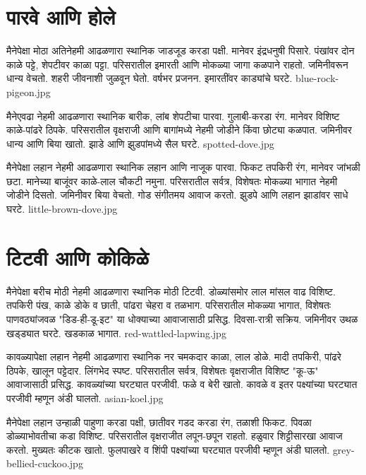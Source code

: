 \documentclass[aspectratio=169]{beamer}
\begin{document}
\section{पारवे आणि होले}
{मैनेपेक्षा मोठा}
{अतिनेहमी आढळणारा स्थानिक}
{जाडजूड करडा पक्षी. मानेवर इंद्रधनुषी पिसारे. पंखांवर दोन काळे पट्टे, शेपटीवर काळा पट्टा.}
{परिसरातील इमारती आणि मोकळ्या जागा}
{कळपाने राहतो. जमिनीवरून धान्य वेचतो. शहरी जीवनाशी जुळवून घेतो.}
{वर्षभर प्रजनन. इमारतींवर काड्यांचे घरटे.}
{blue-rock-pigeon.jpg}

{मैनेएवढा}
{नेहमी आढळणारा स्थानिक}
{बारीक, लांब शेपटीचा पारवा. गुलाबी-करडा रंग. मानेवर विशिष्ट काळे-पांढरे ठिपके.}
{परिसरातील वृक्षराजी आणि बागांमध्ये}
{नेहमी जोडीने किंवा छोट्या कळपात. जमिनीवर धान्य आणि बिया खातो.}
{झाडे आणि झुडपांमध्ये सैल घरटे.}
{spotted-dove.jpg}

{मैनेपेक्षा लहान}
{नेहमी आढळणारा स्थानिक}
{लहान आणि नाजूक पारवा. फिकट तपकिरी रंग, मानेवर जांभळी छटा. मानेच्या बाजूंवर काळे-लाल चौकटी नमुना.}
{परिसरातील सर्वत्र, विशेषतः मोकळ्या भागात}
{नेहमी जोडीने दिसतो. जमिनीवर बिया वेचतो. गोड संगीतमय आवाज करतो.}
{झुडपे आणि लहान झाडांवर साधे घरटे.}
{little-brown-dove.jpg}

\section{टिटवी आणि कोकिळे}
{मैनेपेक्षा बरीच मोठी}
{नेहमी आढळणारा स्थानिक}
{मोठी टिटवी. डोळ्यांसमोर लाल मांसल वाढ विशिष्ट. तपकिरी पंख, काळे डोके व छाती, पांढरा चेहरा व तळभाग.}
{परिसरातील मोकळ्या भागात, विशेषतः पाणवठ्यांजवळ}
{"डिड-ही-डू-इट" या धोक्याच्या आवाजासाठी प्रसिद्ध. दिवसा-रात्री सक्रिय.}
{जमिनीवर उथळ खड्ड्यात घरटे. खडकाळ भागात.}
{red-wattled-lapwing.jpg}

{कावळ्यापेक्षा लहान}
{नेहमी आढळणारा स्थानिक}
{नर चमकदार काळा, लाल डोळे. मादी तपकिरी, पांढरे ठिपके, खालून पट्टेदार. लिंगभेद स्पष्ट.}
{परिसरातील सर्वत्र, विशेषतः वृक्षराजीत}
{विशिष्ट "कू-ऊ" आवाजासाठी प्रसिद्ध. कावळ्यांच्या घरट्यात परजीवी. फळे व बेरी खातो.}
{कावळे व इतर पक्ष्यांच्या घरट्यात परजीवी म्हणून अंडी घालतो.}
{asian-koel.jpg}

{मैनेपेक्षा लहान}
{उन्हाळी पाहुणा}
{करडा पक्षी, छातीवर गडद करडा रंग, तळाशी फिकट. पिवळा डोळ्याभोवतीचा कडा विशिष्ट.}
{परिसरातील वृक्षराजीत}
{लपून-छपून राहतो. हळुवार शिट्टीसारखा आवाज करतो. मुख्यतः कीटक खातो.}
{फुलपाखरे व शिंपी पक्ष्यांच्या घरट्यात परजीवी म्हणून अंडी घालतो.}
{grey-bellied-cuckoo.jpg}
\end{document}
